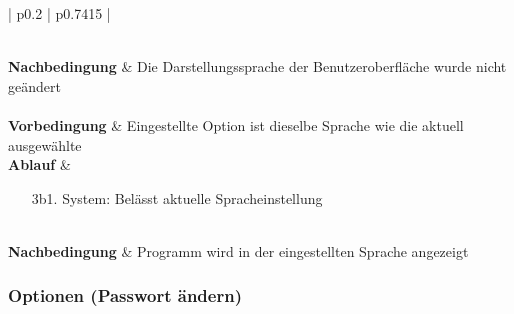 \documentclass[11pt]{article}
\begin{document}
\begin{tabularx}{\textwidth}{| p{} | p{} |}
\begin{enumerate}
		\end{enumerate}
	\\
	\hline
	\textbf{Nachbedingung} & 
	Die Darstellungssprache der Benutzeroberfläche wurde nicht geändert \\
	\hline
	 \\
	\hline
	\textbf{Vorbedingung} & Eingestellte Option ist dieselbe Sprache wie die aktuell ausgewählte \\
	\hline
	\textbf{Ablauf} &
		\begin{enumerate}
			\item[3b1.] System: Belässt aktuelle Spracheinstellung
		\end{enumerate}
	\\
	\hline
	\textbf{Nachbedingung} & Programm wird in der eingestellten Sprache angezeigt \\
	\hline
\end{tabularx}

\newpage

\subsubsection{Optionen (Passwort ändern)}
\end{document}
